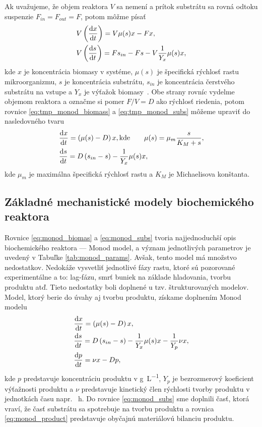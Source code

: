 Ak uvažujeme, že objem reaktora $ V $ sa nemení a prítok substrátu sa rovná odtoku suspenzie $ F_{in} = F_{out} = F $, potom môžme písať
\begin{align}
	&V\left(\frac{\text{d}x}{\text{d}t}\right) = V\mu(s)x - Fx, \label{eq:tmp_monod_biomass} \\
	&V\left(\frac{\text{d}s}{\text{d}t}\right) = Fs_{in} - Fs - V\frac{1}{Y_{x}}\mu(s)x, \label{eq:tmp_monod_subs}
\end{align}
kde $ x $ je koncentrácia biomasy v systéme, $ \mu(s) $ je špecifická rýchlosť rastu mikroorganizmu, $ s $ je koncentrácia substrátu, $ s_{in} $ je koncentrácia čerstvého substrátu na vstupe a $ Y_{x} $ je výťažok biomasy~\cite{panikov:kinetics_MO_processes:2016}. Obe strany rovníc vydelme objemom reaktora a označme si pomer $ F/V = D $ ako rýchlosť riedenia, potom rovnice \eqref{eq:tmp_monod_biomass} a \eqref{eq:tmp_monod_subs} môžeme upraviť do nasledovného tvaru
\begin{align} 
	&\frac{\text{d}x}{\text{d}t} = \left(\mu(s) - D\right)x, \text{kde}  \qquad \mu(s) = \mu_{m}\frac{s}{K_{M} + s}, \label{eq:monod_biomas}\\
	&\frac{\text{d}s}{\text{d}t} = D\left(s_{in} - s\right) - \frac{1}{Y_{x}}\mu(s)x, \label{eq:monod_subs}
\end{align}
kde $ \mu_{m} $ je maximálna špecifická rýchlosť rastu a $ K_{M} $ je Michaelisova konštanta.

\subsection{Základné mechanistické modely biochemického reaktora}
Rovnice \eqref{eq:monod_biomas} a \eqref{eq:monod_subs} tvoria najjednoduchší opis biochemického reaktora --- Monod model, a význam jednotlivých parametrov je uvedený v Tabuľke \ref{tab:monod_params}. Avšak, tento model má množstvo nedostatkov. Nedokáže vysvetliť jednotlivé fázy rastu, ktoré sú pozorované experimentálne a to: lag-fázu, smrť buniek na základe hladovania, tvorbu produktu atď. Tieto nedostatky boli doplnené u tzv. štrukturovaných modelov. Model, ktorý berie do úvahy aj tvorbu produktu, získame doplnením Monod modelu
\begin{align} 
	&\frac{\text{d}x}{\text{d}t} = \left(\mu(s) - D\right)x, \label{eq:chemostat_biomass}\\
	&\frac{\text{d}s}{\text{d}t} = D\left(s_{in} - s\right) - \frac{1}{Y_{x}}\mu(s)x - \frac{1}{Y_{p}}\nu x, \label{eq:chemostat_substrate}\\
	&\frac{\text{d}p}{\text{d}t} = \nu x - Dp, \label{eq:monod_product}
\end{align}
kde $p$ predstavuje koncentráciu produktu v \si{\gram\per\liter}, $Y_{p}$ je bezrozmerový koeficient výťažnosti produktu a $\nu$ predstavuje kinetický člen rýchlosti tvorby produktu v jednotkách času napr. \si{\per\hour}. Do rovnice \eqref{eq:monod_subs} sme doplnili časť, ktorá vraví, že časť substrátu sa spotrebuje na tvorbu produktu a rovnica \eqref{eq:monod_product} predstavuje obyčajnú materiálovú bilanciu produktu. 


